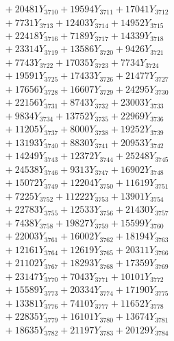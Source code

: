 \documentclass[a4paper,10pt]{article}
\begin{document}
{\begin{align}
&\;  + 20481 Y_{3710} + 19594 Y_{3711} + 17041 Y_{3712} \\[0.3ex]
&\;  + 7731 Y_{3713} + 12403 Y_{3714} + 14952 Y_{3715} \\[0.3ex]
&\;  + 22418 Y_{3716} + 7189 Y_{3717} + 14339 Y_{3718} \\[0.5ex]\allowbreak
&\;  + 23314 Y_{3719} + 13586 Y_{3720} + 9426 Y_{3721} \\[0.3ex]
&\;  + 7743 Y_{3722} + 17035 Y_{3723} + 7734 Y_{3724} \\[0.3ex]
&\;  + 19591 Y_{3725} + 17433 Y_{3726} + 21477 Y_{3727} \\[0.3ex]
&\;  + 17656 Y_{3728} + 16607 Y_{3729} + 24295 Y_{3730} \\[0.3ex]
&\;  + 22156 Y_{3731} + 8743 Y_{3732} + 23003 Y_{3733} \\[0.3ex]
&\;  + 9834 Y_{3734} + 13752 Y_{3735} + 22969 Y_{3736} \\[0.3ex]
&\;  + 11205 Y_{3737} + 8000 Y_{3738} + 19252 Y_{3739} \\[0.3ex]
&\;  + 13193 Y_{3740} + 8830 Y_{3741} + 20953 Y_{3742} \\[0.3ex]
&\;  + 14249 Y_{3743} + 12372 Y_{3744} + 25248 Y_{3745} \\[0.3ex]
&\;  + 24538 Y_{3746} + 9313 Y_{3747} + 16902 Y_{3748} \\[0.5ex]\allowbreak
&\;  + 15072 Y_{3749} + 12204 Y_{3750} + 11619 Y_{3751} \\[0.3ex]
&\;  + 7225 Y_{3752} + 11222 Y_{3753} + 13901 Y_{3754} \\[0.3ex]
&\;  + 22783 Y_{3755} + 12533 Y_{3756} + 21430 Y_{3757} \\[0.3ex]
&\;  + 7438 Y_{3758} + 19827 Y_{3759} + 15599 Y_{3760} \\[0.3ex]
&\;  + 22003 Y_{3761} + 16002 Y_{3762} + 18194 Y_{3763} \\[0.3ex]
&\;  + 12161 Y_{3764} + 12619 Y_{3765} + 20311 Y_{3766} \\[0.3ex]
&\;  + 21102 Y_{3767} + 18293 Y_{3768} + 17359 Y_{3769} \\[0.3ex]
&\;  + 23147 Y_{3770} + 7043 Y_{3771} + 10101 Y_{3772} \\[0.3ex]
&\;  + 15589 Y_{3773} + 20334 Y_{3774} + 17190 Y_{3775} \\[0.3ex]
&\;  + 13381 Y_{3776} + 7410 Y_{3777} + 11652 Y_{3778} \\[0.5ex]\allowbreak
&\;  + 22835 Y_{3779} + 16101 Y_{3780} + 13674 Y_{3781} \\[0.3ex]
&\;  + 18635 Y_{3782} + 21197 Y_{3783} + 20129 Y_{3784} \\[0.3ex]

\end{align}}
\end{document}
